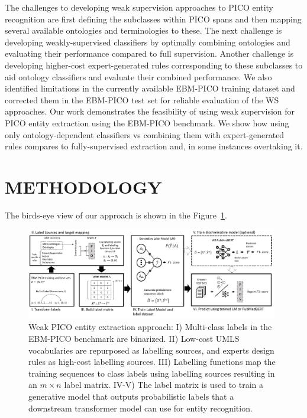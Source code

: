 \documentclass[10.7pt,]{article}
\begin{document}
The challenges to developing weak supervision approaches to PICO entity recognition are first defining the subclasses within PICO spans and then mapping several available ontologies and terminologies to these.
The next challenge is developing weakly-supervised classifiers by optimally combining ontologies and evaluating their performance compared to full supervision.
Another challenge is developing higher-cost expert-generated rules corresponding to these subclasses to aid ontology classifiers and evaluate their combined performance.
We also identified limitations in the currently available EBM-PICO training dataset and corrected them in the EBM-PICO test set for reliable evaluation of the WS approaches.
Our work demonstrates the feasibility of using weak supervision for PICO entity extraction using the EBM-PICO benchmark.
We show how using only ontology-dependent classifiers vs combining them with expert-generated rules compares to fully-supervised extraction and, in some instances overtaking it.
%
%
%
\section{METHODOLOGY}\label{methods}
%
The birds-eye view of our approach is shown in the Figure~\ref{fig:approach}.
%
\begin{figure}[ht]
\centering
\includegraphics[width=0.98\textwidth]{figures/approach.pdf}
\caption{Weak PICO entity extraction approach: I) Multi-class labels in the EBM-PICO benchmark are binarized. II) Low-cost UMLS vocabularies are repurposed as labelling sources, and experts design rules as high-cost labelling sources. III) Labelling functions map the training sequences to class labels using labelling sources resulting in an $m \times n$ label matrix. IV-V) The label matrix is used to train a generative model that outputs probabilistic labels that a downstream transformer model can use for entity recognition.}
\label{fig:approach}
\end{figure}
%
\end{document}
